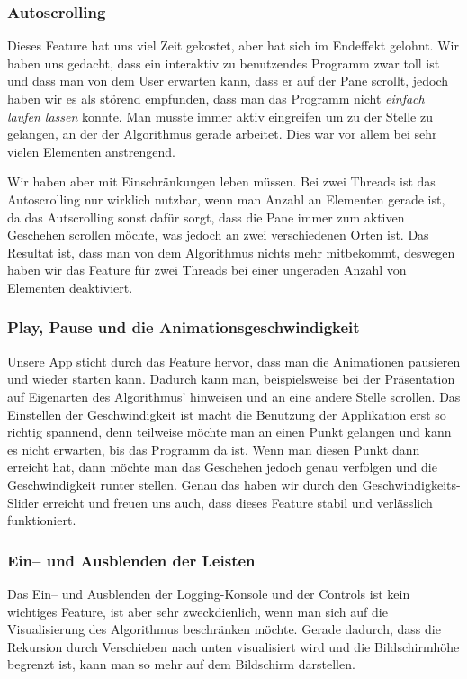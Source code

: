 \subsubsection{Autoscrolling}
Dieses Feature hat uns viel Zeit gekostet, aber hat sich im Endeffekt gelohnt. Wir haben uns gedacht, dass ein interaktiv zu benutzendes Programm zwar toll ist und dass man von dem User erwarten kann, dass er auf der Pane scrollt, jedoch haben wir es als störend empfunden, dass man das Programm nicht \textit{einfach laufen lassen} konnte. Man musste immer aktiv eingreifen um zu der Stelle zu gelangen, an der der Algorithmus gerade arbeitet. Dies war vor allem bei sehr vielen Elementen anstrengend.

Wir haben aber mit Einschränkungen leben müssen. Bei zwei Threads ist das Autoscrolling nur wirklich nutzbar, wenn man Anzahl an Elementen gerade ist, da das Autscrolling sonst dafür sorgt, dass die Pane immer zum aktiven Geschehen scrollen möchte, was jedoch an zwei verschiedenen Orten ist. Das Resultat ist, dass man von dem Algorithmus nichts mehr mitbekommt, deswegen haben wir das Feature für zwei Threads bei einer ungeraden Anzahl von Elementen deaktiviert.

\subsubsection{Play, Pause und die Animationsgeschwindigkeit}
Unsere App sticht durch das Feature hervor, dass man die Animationen pausieren und wieder starten kann. Dadurch kann man, beispielsweise bei der Präsentation auf Eigenarten des Algorithmus' hinweisen und an eine andere Stelle scrollen. Das Einstellen der Geschwindigkeit ist macht die Benutzung der Applikation erst so richtig spannend, denn teilweise möchte man an einen Punkt gelangen und kann es nicht erwarten, bis das Programm da ist. Wenn man diesen Punkt dann erreicht hat, dann möchte man das Geschehen jedoch genau verfolgen und die Geschwindigkeit runter stellen. Genau das haben wir durch den Geschwindigkeits-Slider erreicht und freuen uns auch, dass dieses Feature stabil und verlässlich funktioniert.

\subsubsection{Ein-- und Ausblenden der Leisten}
Das Ein-- und Ausblenden der Logging-Konsole und der Controls ist kein wichtiges Feature, ist aber sehr zweckdienlich, wenn man sich auf die Visualisierung des Algorithmus beschränken möchte. Gerade dadurch, dass die Rekursion durch Verschieben nach unten visualisiert wird und die Bildschirmhöhe begrenzt ist, kann man so mehr auf dem Bildschirm darstellen.

